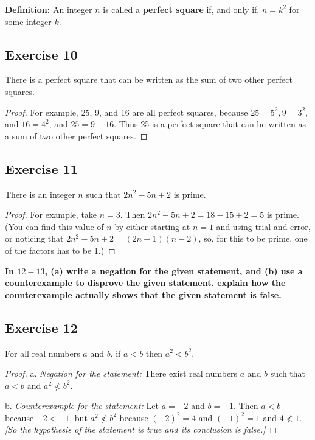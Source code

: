 \documentclass[14pt]{extarticle}
\newcommand{\cy}{\color{cyan}}
\begin{document}
\begin{tcolorbox}[colframe=cyan]
{\bf \cy Definition:} An integer $n$ is called a {\bf perfect square} if, and only if, $n = k^2$ for some integer $k$.
\end{tcolorbox}

\subsection{Exercise 10}
There is a perfect square that can be written as the sum of two other perfect squares.

\begin{proof}
For example, 25, 9, and 16 are all perfect squares, because $25 = 5^2, 9 = 3^2$, and $16 = 4^2$, and $25 = 9 + 16$. Thus 25 is a perfect square that can be written as a sum of two other perfect squares.
\end{proof}

\subsection{Exercise 11}
There is an integer $n$ such that $2n^2 - 5n + 2$ is prime.

\begin{proof}
For example, take $n = 3$. Then $2n^2 - 5n + 2 = 18 - 15 + 2 = 5$ is prime. (You can find this value of $n$ by either starting at $n = 1$ and using trial and error, or noticing that $2n^2 - 5n + 2 = (2n - 1)(n - 2)$, so, for this to be prime, one of the factors has to be 1.)
\end{proof}

{\bf \cy In $12-13$, (a) write a negation for the given statement, and (b) use a counterexample to disprove the given statement. explain how the counterexample actually shows that the given statement is false.}

\subsection{Exercise 12}
For all real numbers $a$ and $b$, if $a < b$ then $a^2 < b^2$.

\begin{proof}
a. {\it Negation for the statement:} There exist real numbers $a$ and $b$ such that $a < b$ and $a^2 \nless b^2$.

b. {\it Counterexample for the statement:} Let $a = -2$ and
$b = -1$. Then $a < b$ because $-2 < -1$, but $a^2 \nless b^2$ because $(-2)^2 = 4$ and $(-1)^2 = 1$ and $4 \nless 1$. {\it [So the hypothesis of the statement is true and its conclusion is false.]}
\end{proof}
\end{document}
